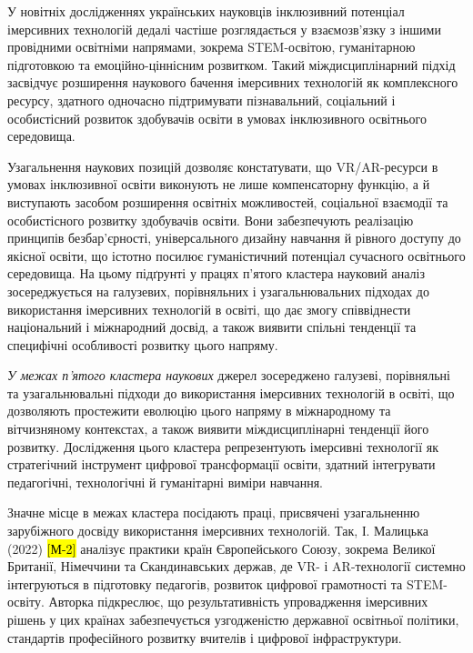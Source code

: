 У новітніх дослідженнях українських науковців інклюзивний потенціал імерсивних технологій дедалі частіше розглядається у взаємозв'язку з іншими провідними освітніми напрямами, зокрема STEM-освітою, гуманітарною підготовкою та емоційно-ціннісним розвитком. Такий міждисциплінарний підхід засвідчує розширення наукового бачення імерсивних технологій як комплексного ресурсу, здатного одночасно підтримувати пізнавальний, соціальний і особистісний розвиток здобувачів освіти в умовах інклюзивного освітнього середовища.

Узагальнення наукових позицій дозволяє констатувати, що VR/AR-ресурси в умовах інклюзивної освіти виконують не лише компенсаторну функцію, а й виступають засобом розширення освітніх можливостей, соціальної взаємодії та особистісного розвитку здобувачів освіти. Вони забезпечують реалізацію принципів безбар'єрності, універсального дизайну навчання й рівного доступу до якісної освіти, що істотно посилює гуманістичний потенціал сучасного освітнього середовища. На цьому підґрунті у працях п'ятого кластера науковий аналіз зосереджується на галузевих, порівняльних і узагальнювальних підходах до використання імерсивних технологій в освіті, що дає змогу співвіднести національний і міжнародний досвід, а також виявити спільні тенденції та специфічні особливості розвитку цього напряму.

\emph{У межах п'ятого кластера наукових} джерел зосереджено галузеві, порівняльні та узагальнювальні підходи до використання імерсивних технологій в освіті, що дозволяють простежити еволюцію цього напряму в міжнародному та вітчизняному контекстах, а також виявити міждисциплінарні тенденції його розвитку. Дослідження цього кластера репрезентують імерсивні технології як стратегічний інструмент цифрової трансформації освіти, здатний інтегрувати педагогічні, технологічні й гуманітарні виміри навчання.

Значне місце в межах кластера посідають праці, присвячені узагальненню зарубіжного досвіду використання імерсивних технологій. Так, І. Малицька (2022) \hl{{[}М-2{]}} аналізує практики країн Європейського Союзу, зокрема Великої Британії, Німеччини та Скандинавських держав, де VR- і AR-технології системно інтегруються в підготовку педагогів, розвиток цифрової грамотності та STEM-освіту. Авторка підкреслює, що результативність упровадження імерсивних рішень у цих країнах забезпечується узгодженістю державної освітньої політики, стандартів професійного розвитку вчителів і цифрової інфраструктури.


